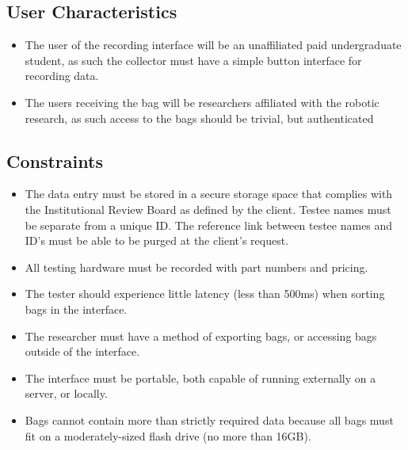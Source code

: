 \documentclass[onecolumn, draftclsnofoot,10pt, compsoc]{report}
\begin{document}
	\subsection{User Characteristics}
	\begin{itemize}
		\item The user of the recording interface will be an unaffiliated paid undergraduate student, as such the collector must have a simple button interface for recording data.
		\item The users receiving the bag will be researchers affiliated with the robotic research, as such access to the bags should be trivial, but authenticated
		
	\end{itemize}
	\subsection{Constraints}
	\begin{itemize}
		\item The data entry must be stored in a secure storage space that complies with the Institutional Review Board as defined by the client.
		\subitem Testee names must be separate from a unique ID.
		\subitem The reference link between testee names and ID's must be able to be purged at the client's request.
		\item All testing hardware must be recorded with part numbers and pricing.
		\item The tester should experience little latency (less than 500ms) when sorting bags in the interface.
		\item The researcher must have a method of exporting bags, or accessing bags outside of the interface.
		\item The interface must be portable, both capable of running externally on a server, or locally.
		\item Bags cannot contain more than strictly required data because all bags must fit on a moderately-sized flash drive (no more than 16GB).
	\end{itemize}
\end{document}
